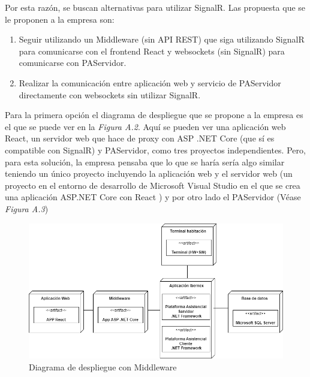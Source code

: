 Por esta razón, se buscan alternativas para utilizar SignalR. Las propuesta que se le proponen a la empresa son: 
\begin{enumerate}
    \item Seguir utilizando un Middleware (sin API REST) que siga utilizando SignalR para comunicarse con el frontend React y websockets (sin SignalR) para comunicarse con PAServidor.
    \item Realizar la comunicación entre aplicación web y servicio de PAServidor directamente con websockets sin utilizar SignalR.
\end{enumerate}

Para la primera opción el diagrama de despliegue que se propone a la empresa es el que se puede ver en la \textit{Figura A.2}. Aquí se pueden ver una aplicación web React, un servidor web que hace de proxy con ASP .NET Core (que sí es compatible con SignalR) y PAServidor, como tres proyectos independientes. Pero, para esta solución, la empresa pensaba que lo que se haría sería algo similar teniendo un único proyecto incluyendo la aplicación web y el servidor web (un proyecto en el entorno de desarrollo de Microsoft Visual Studio en el que se crea una aplicación ASP.NET Core con React \cite{vs-project} ) y por otro lado el PAServidor (Véase \textit{Figura A.3})\\

\begin{figure}[H]
    \centering
    \includegraphics[width=15cm]{Imagenes/Arquitectura-despliegue-2}
    \caption{Diagrama de despliegue con Middleware}
    \label{fig:despliegue-2}
\end{figure}


